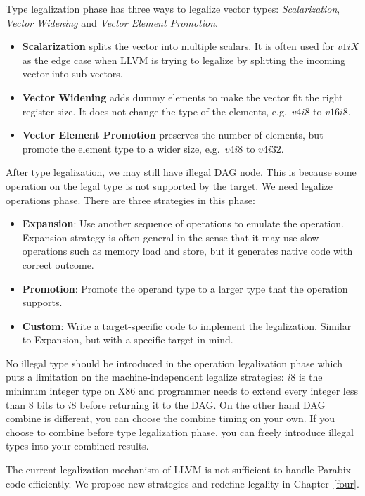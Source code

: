 Type legalization phase has three ways to legalize vector types\cite{hybrid_simd_type_legalize}: \textit{Scalarization}, \textit{Vector Widening} and \textit{Vector Element Promotion}.

\begin{itemize}
    \item \textbf{Scalarization} splits the vector into multiple scalars. It is often used for $v1iX$ as the edge case when LLVM is trying to legalize by splitting the incoming vector into sub vectors.
    \item \textbf{Vector Widening} adds dummy elements to make the vector fit the right register size. It does not change the type of the elements, e.g.\ $v4i8$ to $v16i8$.
    \item \textbf{Vector Element Promotion} preserves the number of elements, but promote the element type to a wider size, e.g.\ $v4i8$ to $v4i32$.
\end{itemize}

After type legalization, we may still have illegal DAG node. This is because some operation on the legal type is not supported by the target. We need legalize operations phase. There are three strategies in this phase:

\begin{itemize}
    \item \textbf{Expansion}: Use another sequence of operations to emulate the operation. Expansion strategy is often general in the sense that it may use slow operations such as memory load and store, but it generates native code with correct outcome.
    \item \textbf{Promotion}: Promote the operand type to a larger type that the operation supports.
    \item \textbf{Custom}: Write a target-specific code to implement the legalization. Similar to Expansion, but with a specific target in mind.
\end{itemize}

No illegal type should be introduced in the operation legalization phase which puts a limitation on the machine-independent legalize strategies: $i8$ is the minimum integer type on X86 and programmer needs to extend every integer less than 8 bits to $i8$ before returning it to the DAG\@. On the other hand DAG combine is different, you can choose the combine timing on your own. If you choose to combine before type legalization phase, you can freely introduce illegal types into your combined results.

The current legalization mechanism of LLVM is not sufficient to handle Parabix code efficiently. We propose new strategies and redefine legality in Chapter~\ref{four}.

